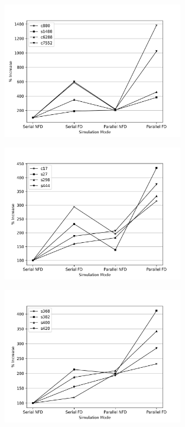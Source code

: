 \documentclass[a4paper,12pt]{article}
\begin{document}
\begin{figure}[h]  
  \centering
    \includegraphics[width=0.7\textwidth]{figure.png}
\end{figure}

\begin{figure}[h]  
  \centering
    \includegraphics[width=0.7\textwidth]{figure1.png}
\end{figure}


\begin{figure}[h]  
  \centering
    \includegraphics[width=0.7\textwidth]{figure2.png}
\end{figure}
\end{document}
